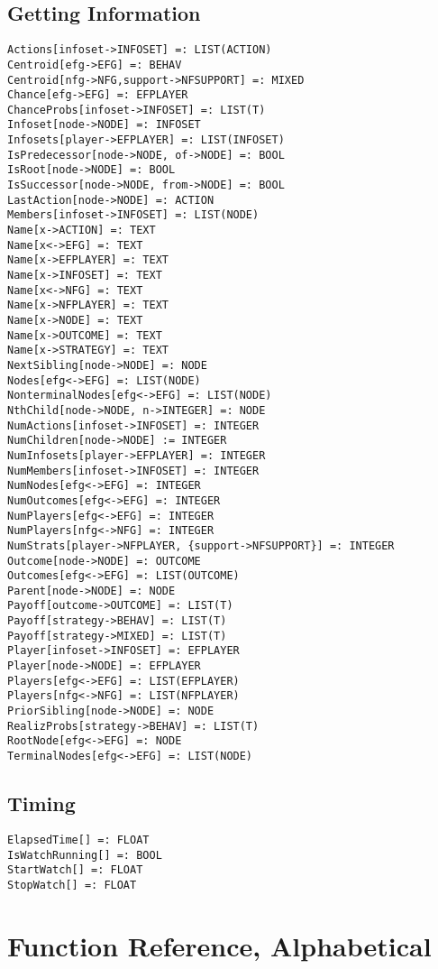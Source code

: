 \subsection{Getting Information}

\begin{verbatim}
Actions[infoset->INFOSET] =: LIST(ACTION)
Centroid[efg->EFG] =: BEHAV
Centroid[nfg->NFG,support->NFSUPPORT] =: MIXED
Chance[efg->EFG] =: EFPLAYER
ChanceProbs[infoset->INFOSET] =: LIST(T)
Infoset[node->NODE] =: INFOSET
Infosets[player->EFPLAYER] =: LIST(INFOSET)
IsPredecessor[node->NODE, of->NODE] =: BOOL
IsRoot[node->NODE] =: BOOL
IsSuccessor[node->NODE, from->NODE] =: BOOL
LastAction[node->NODE] =: ACTION
Members[infoset->INFOSET] =: LIST(NODE)
Name[x->ACTION] =: TEXT
Name[x<->EFG] =: TEXT
Name[x->EFPLAYER] =: TEXT
Name[x->INFOSET] =: TEXT
Name[x<->NFG] =: TEXT
Name[x->NFPLAYER] =: TEXT
Name[x->NODE] =: TEXT
Name[x->OUTCOME] =: TEXT
Name[x->STRATEGY] =: TEXT
NextSibling[node->NODE] =: NODE
Nodes[efg<->EFG] =: LIST(NODE)
NonterminalNodes[efg<->EFG] =: LIST(NODE)
NthChild[node->NODE, n->INTEGER] =: NODE
NumActions[infoset->INFOSET] =: INTEGER
NumChildren[node->NODE] := INTEGER
NumInfosets[player->EFPLAYER] =: INTEGER
NumMembers[infoset->INFOSET] =: INTEGER
NumNodes[efg<->EFG] =: INTEGER
NumOutcomes[efg<->EFG] =: INTEGER
NumPlayers[efg<->EFG] =: INTEGER
NumPlayers[nfg<->NFG] =: INTEGER
NumStrats[player->NFPLAYER, {support->NFSUPPORT}] =: INTEGER
Outcome[node->NODE] =: OUTCOME
Outcomes[efg<->EFG] =: LIST(OUTCOME)
Parent[node->NODE] =: NODE
Payoff[outcome->OUTCOME] =: LIST(T)
Payoff[strategy->BEHAV] =: LIST(T)
Payoff[strategy->MIXED] =: LIST(T)
Player[infoset->INFOSET] =: EFPLAYER
Player[node->NODE] =: EFPLAYER
Players[efg<->EFG] =: LIST(EFPLAYER)
Players[nfg<->NFG] =: LIST(NFPLAYER)
PriorSibling[node->NODE] =: NODE
RealizProbs[strategy->BEHAV] =: LIST(T)
RootNode[efg<->EFG] =: NODE
TerminalNodes[efg<->EFG] =: LIST(NODE)
\end{verbatim}

\subsection{Timing}

\begin{verbatim}
ElapsedTime[] =: FLOAT
IsWatchRunning[] =: BOOL
StartWatch[] =: FLOAT
StopWatch[] =: FLOAT
\end{verbatim}


\section{Function Reference, Alphabetical}

